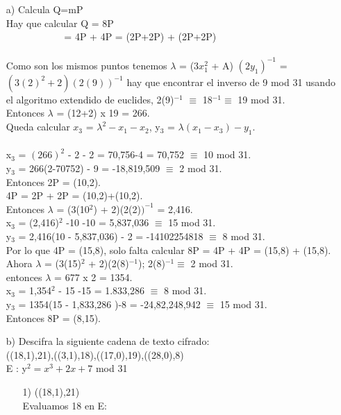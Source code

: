 \documentclass[11pt,letterpaper]{article}
\begin{document}
\begin{enumerate}
\begin{itemize}
\item[a)] Calcula Q=mP\\
Hay que calcular Q = 8P\\$ ~~~~~~~~~~~~~~~~~~~~~~~~~~~$= 4P + 4P = (2P+2P) + (2P+2P)\\\\
Como son los mismos puntos tenemos $\lambda$ = (3$x_{1}^{2}$ + A) $(2y_{1})^{-1}$ = $(3(2)^{2} + 2)(2(9))^{-1}$ hay que encontrar el inverso de 9 mod 31 usando el algoritmo extendido de euclides, 2(9)$^{-1}$ $\equiv$ 18$^{-1} \equiv $ 19 mod 31.\\
Entonces $\lambda$ = (12+2) x 19 = 266.\\
Queda calcular $x_{3}$ = $\lambda^{2} - x_{1} - x_{2}$, y$_3$ = $\lambda(x_{1} - x_{3}) - y_{1}$.
\\
\\x$_{3}$ = $(266)^{2}$ - 2 - 2 = 70,756-4 = 70,752 $\equiv$ 10 mod 31.
\\y$_{3}$ = 266(2-70752) - 9 = -18,819,509 $\equiv$  2 mod 31.\\
Entonces 2P = (10,2).\\
4P = 2P + 2P =  (10,2)+(10,2).\\
Entonces $\lambda$ = (3(10$^{2}$) + 2)(2(2)$)^{-1}$ = 2,416.\\
x$_{3}$ = (2,416)$^{2}$ -10 -10 = 5,837,036 $\equiv$ 15 mod 31.\\
y$_{3}$ = 2,416(10 - 5,837,036) - 2 = -14102254818 $\equiv$ 8 mod 31.\\
Por lo que 4P = (15,8), solo falta calcular 8P = 4P + 4P = (15,8) + (15,8).\\
Ahora $\lambda$ = (3(15)$^{2}$ + 2)(2(8)$^{-1}$); 2(8)$^{-1} \equiv $ 2 mod 31. \\
entonces $\lambda$ = 677 x 2 = 1354.\\
x$_{3}$ = 1,354$^{2}$ - 15 -15 = 1.833,286 $\equiv$ 8 mod 31.\\
y$_{3}$ = 1354(15 - 1,833,286 )-8 = -24,82,248,942 $\equiv$ 15 mod 31.\\
Entonces 8P = (8,15).
\item[b)] Descifra la siguiente cadena de texto cifrado: \\
((18,1),21),((3,1),18),((17,0),19),((28,0),8)\\
E : y$^{2} = x^{3} + 2x + 7$ mod 31
\begin{itemize}
\item[1)] ((18,1),21)\\
Evaluamos 18 en E:\\

\end{itemize}
\end{itemize}
\end{enumerate}
\end{document}
